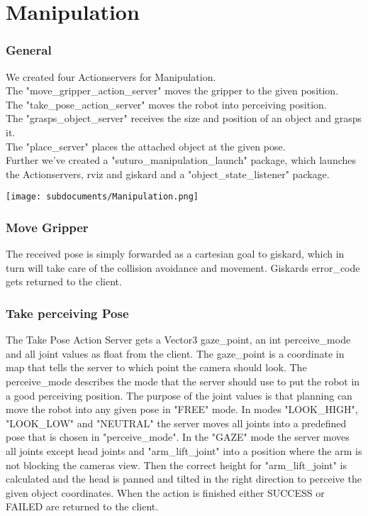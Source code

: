 \documentclass[main.tex]{subfiles}
\begin{document}
	
	\chapter{Manipulation}
	
	\subsection{General}
	We created four Actionservers for Manipulation.\\
	The "move\_gripper\_action\_server" moves the gripper to the given position.\\
	The "take\_pose\_action\_server" moves the robot into perceiving position.\\
	The "grasps\_object\_server" receives the size and position of an object and grasps it.\\
	The "place\_server" places the attached object at the given pose.\\
	Further we've created a "suturo\_manipulation\_launch" package, which launches the Actionservers, rviz and giskard and a "object\_state\_listener" package.
	
	\texttt{[image: subdocuments/Manipulation.png]}
	
	\subsection{Move Gripper}
	The received pose is simply forwarded as a cartesian goal to giskard, which in turn will take care of the collision avoidance and movement. Giskards error\_code gets returned to the client.
	\vspace{1cm}
	
	\subsection{Take perceiving Pose}
	The Take Pose Action Server gets a Vector3 gaze\_point, an int perceive\_mode and all joint values as float from the client. The gaze\_point is a coordinate in map that tells the server to which point the camera should look. The perceive\_mode describes the mode that the server should use to put the robot in a good perceiving position. The purpose of the joint values is that planning can move the robot into any given pose in "FREE" mode. In modes "LOOK\_HIGH", "LOOK\_LOW" and "NEUTRAL" the server moves all joints into a predefined pose that is chosen in "perceive\_mode". In the "GAZE" mode the server moves all joints except head joints and "arm\_lift\_joint" into a position where the arm is not blocking the cameras view. Then the correct height for "arm\_lift\_joint" is calculated and the head is panned and tilted in the right direction to perceive the given object coordinates. When the action is finished either SUCCESS or FAILED are returned to the client.
\end{document}
